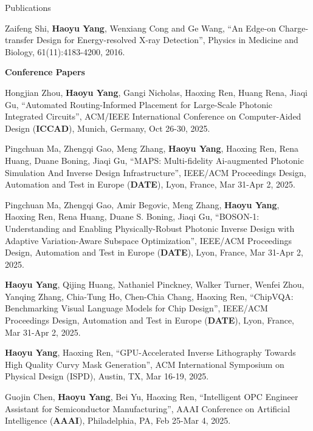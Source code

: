 \begin{rSection}{Publications}
\begin{description}[font=\normalfont]
\item[{[J1]}]{
    Zaifeng Shi, \textbf{Haoyu Yang}, Wenxiang Cong and Ge Wang,
    ``An Edge-on Charge-transfer Design for Energy-resolved X-ray Detection'',
    Physics in Medicine and Biology, 61(11):4183-4200, 2016.
}

\end{description}

\textbf{Conference Papers}
\begin{description}[font=\normalfont]

	\item[{[C42]}] Hongjian Zhou, \textbf{Haoyu Yang}, Gangi Nicholas, Haoxing Ren, Huang Rena, Jiaqi Gu, ``Automated Routing-Informed Placement for Large-Scale Photonic Integrated Circuits'', ACM/IEEE International Conference on Computer-Aided Design (\textbf{ICCAD}), Munich, Germany, Oct 26-30, 2025.
	
	\item[{[C41]}] Pingchuan Ma, Zhengqi Gao, Meng Zhang, \textbf{Haoyu Yang}, Haoxing Ren, Rena Huang, Duane Boning, Jiaqi Gu, ``MAPS: Multi-fidelity Ai-augmented Photonic Simulation And Inverse Design Infrastructure'', IEEE/ACM Proceedings Design, Automation and Test in Europe (\textbf{DATE}), Lyon, France, Mar 31-Apr 2, 2025.
	
	\item[{[C40]}] Pingchuan Ma, Zhengqi Gao, Amir Begovic, Meng Zhang, \textbf{Haoyu Yang}, Haoxing Ren, Rena Huang, Duane S. Boning, Jiaqi Gu, ``BOSON-1: Understanding and Enabling Physically-Robust Photonic Inverse Design with Adaptive Variation-Aware Subspace Optimization'', IEEE/ACM Proceedings Design, Automation and Test in Europe (\textbf{DATE}), Lyon, France, Mar 31-Apr 2, 2025.
	
	\item[{[C39]}] \textbf{Haoyu Yang}, Qijing Huang, Nathaniel Pinckney, Walker Turner, Wenfei Zhou, Yanqing Zhang, Chia-Tung Ho, Chen-Chia Chang, Haoxing Ren, ``ChipVQA: Benchmarking Visual Language Models for Chip Design'', IEEE/ACM Proceedings Design, Automation and Test in Europe (\textbf{DATE}), Lyon, France, Mar 31-Apr 2, 2025.
	
	\item[{[C38]}] \textbf{Haoyu Yang}, Haoxing Ren, ``GPU-Accelerated Inverse Lithography Towards High Quality Curvy Mask Generation'', ACM International Symposium on Physical Design (ISPD), Austin, TX, Mar 16-19, 2025.
	
	\item[{[C37]}] Guojin Chen, \textbf{Haoyu Yang}, Bei Yu, Haoxing Ren, ``Intelligent OPC Engineer Assistant for Semiconductor Manufacturing'', AAAI Conference on Artificial Intelligence (\textbf{AAAI}), Philadelphia, PA, Feb 25-Mar 4, 2025.
	

\end{description}
\end{rSection}
